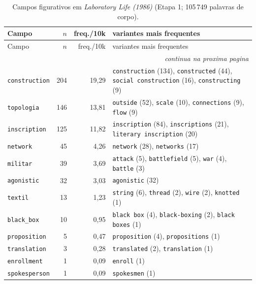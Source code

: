 {\footnotesize
\begin{longtable}{@{}l r r >{\raggedright\arraybackslash}p{6.4cm}@{}}
\caption{Campos figurativos em \emph{Laboratory Life (1986)} (Etapa 1; 105\,749 palavras de corpo).}\label{tab:campos-ll86}\\
\toprule
Campo & $n$ & freq./10k & variantes mais frequentes \\
\midrule \endfirsthead
\toprule Campo & $n$ & freq./10k & variantes mais frequentes \\ \midrule \endhead
\midrule \multicolumn{4}{r}{\footnotesize \emph{continua na proxima pagina}}\\ \endfoot
\bottomrule \endlastfoot
\texttt{construction} & 204 & 19{,}29 & \texttt{construction} (134), \texttt{constructed} (44), \texttt{social construction} (16), \texttt{constructing} (9) \\
\texttt{topologia} & 146 & 13{,}81 & \texttt{outside} (52), \texttt{scale} (10), \texttt{connections} (9), \texttt{flow} (9) \\
\texttt{inscription} & 125 & 11{,}82 & \texttt{inscription} (84), \texttt{inscriptions} (21), \texttt{literary inscription} (20) \\
\texttt{network} & 45 & 4{,}26 & \texttt{network} (28), \texttt{networks} (17) \\
\texttt{militar} & 39 & 3{,}69 & \texttt{attack} (5), \texttt{battlefield} (5), \texttt{war} (4), \texttt{battle} (3) \\
\texttt{agonistic} & 32 & 3{,}03 & \texttt{agonistic} (32) \\
\texttt{textil} & 13 & 1{,}23 & \texttt{string} (6), \texttt{thread} (2), \texttt{wire} (2), \texttt{knotted} (1) \\
\texttt{black\_box} & 10 & 0{,}95 & \texttt{black box} (4), \texttt{black-boxing} (2), \texttt{black boxes} (1) \\
\texttt{proposition} & 5 & 0{,}47 & \texttt{proposition} (4), \texttt{propositions} (1) \\
\texttt{translation} & 3 & 0{,}28 & \texttt{translated} (2), \texttt{translation} (1) \\
\texttt{enrollment} & 1 & 0{,}09 & \texttt{enroll} (1) \\
\texttt{spokesperson} & 1 & 0{,}09 & \texttt{spokesmen} (1) \\
\end{longtable}}

